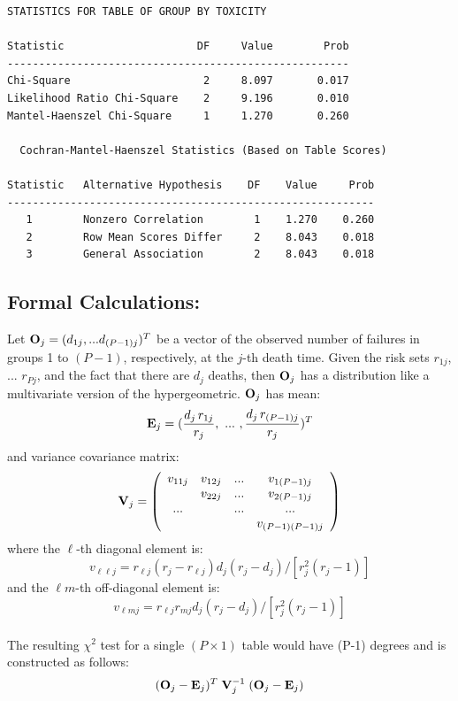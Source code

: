 \documentclass[11pt,slidesonly,semrot,portrait,palatino]{book}
\begin{document}
{\begin{verbatim}
STATISTICS FOR TABLE OF GROUP BY TOXICITY

Statistic                     DF     Value        Prob
------------------------------------------------------
Chi-Square                     2     8.097       0.017
Likelihood Ratio Chi-Square    2     9.196       0.010
Mantel-Haenszel Chi-Square     1     1.270       0.260

  Cochran-Mantel-Haenszel Statistics (Based on Table Scores)

Statistic   Alternative Hypothesis    DF    Value     Prob
----------------------------------------------------------
   1        Nonzero Correlation        1    1.270    0.260
   2        Row Mean Scores Differ     2    8.043    0.018
   3        General Association        2    8.043    0.018
\end{verbatim}
\subsection{Formal Calculations:}
Let ${\bf O}_j = (d_{1j},...d_{(P-1)j})^T$ be a vector
of the observed number of failures in groups 1 to $(P-1)$,
respectively, at the $j$-th death time.  Given the
risk sets $r_{1j}$, ... $r_{Pj}$, and the fact that there are
$d_j$ deaths, then ${\bf O}_j$ has a distribution like a
multivariate version of the hypergeometric.  ${\bf O}_j$ has mean:
\\[2ex]
\[   {\bf E}_j = (\frac{d_{j}\, r_{1j}}{r_j},~...~,
\frac{d_{j} \, r_{(P-1)j}}{r_j})^T \]
and variance covariance matrix:
  \[   {\bf V}_j = \left( \begin{array}{cccc}
                          v_{11j} & v_{12j} & ... & v_{1(P-1)j} \\
                                  & v_{22j} & ... & v_{2(P-1)j} \\
                              ... &         & ... & ... \\
                                  &         &     & v_{(P-1)(P-1)j} \\
                    \end{array} \right)  \]
where the $\ell$-th diagonal element is:
\[     v_{\ell\ell j} = r_{\ell j}(r_j-r_{\ell j})
d_j(r_j-d_j)/[r_j^2(r_j-1)]  \]
and the $\ell m$-th off-diagonal element is:
\[     v_{\ell m j} = r_{\ell j}r_{mj}d_j(r_j-d_j)/[r_j^2(r_j-1)]  \]
\\[2ex]
The resulting $\chi^2$ test for a single $(P \times 1)$ table would
have (P-1) degrees and is constructed as follows:
\[   ( {\bf O}_j - {\bf E}_j)^T \; {\bf V}^{-1}_j \; ( {\bf O}_j - {\bf E}_j)
\]

}
\end{document}
